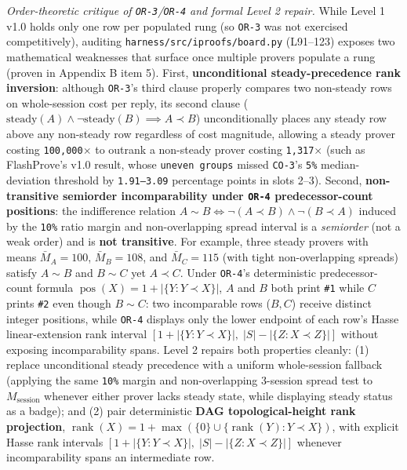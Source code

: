 \documentclass[11pt,letterpaper]{article}
\begin{document}
\textit{Order-theoretic critique of \texttt{OR-3}/\texttt{OR-4} and formal Level 2 repair.} While Level 1 v1.0 holds only one row per populated rung (so \texttt{OR-3} was not exercised competitively), auditing \texttt{harness/\allowbreak{}src/\allowbreak{}iproofs/\allowbreak{}board.\allowbreak{}py} (L91--123) exposes two mathematical weaknesses that surface once multiple provers populate a rung (proven in Appendix B item 5). First, \textbf{unconditional steady-precedence rank inversion}: although \texttt{OR-3}'s third clause properly compares two non-steady rows on whole-session cost per reply, its second clause ($\text{steady}(A) \land \neg\text{steady}(B) \implies A \prec B$) unconditionally places any steady row above any non-steady row regardless of cost magnitude, allowing a steady prover costing \texttt{100,000$\times$} to outrank a non-steady prover costing \texttt{1,317$\times$} (such as FlashProve's v1.0 result, whose \texttt{uneven groups} missed \texttt{CO-3}'s \texttt{5\%} median-deviation threshold by \texttt{1.91--3.09} percentage points in slots 2--3). Second, \textbf{non-transitive semiorder incomparability under \texttt{OR-4} predecessor-count positions}: the indifference relation $A \sim B \iff \neg(A \prec B) \land \neg(B \prec A)$ induced by the \texttt{10\%} ratio margin and non-overlapping spread interval is a \textit{semiorder} (not a weak order) and is \textbf{not transitive}. For example, three steady provers with means $\bar{M}_A = 100$, $\bar{M}_B = 108$, and $\bar{M}_C = 115$ (with tight non-overlapping spreads) satisfy $A \sim B$ and $B \sim C$ yet $A \prec C$. Under \texttt{OR-4}'s deterministic predecessor-count formula $\operatorname{pos}(X) = 1 + |\{Y : Y \prec X\}|$, $A$ and $B$ both print \texttt{\#1} while $C$ prints \texttt{\#2} even though $B \sim C$: two incomparable rows ($B, C$) receive distinct integer positions, while \texttt{OR-4} displays only the lower endpoint of each row's Hasse linear-extension rank interval $[1 + |\{Y : Y \prec X\}|,\; |S| - |\{Z : X \prec Z\}|]$ without exposing incomparability spans. Level 2 repairs both properties cleanly: (1) replace unconditional steady precedence with a uniform whole-session fallback (applying the same \texttt{10\%} margin and non-overlapping 3-session spread test to $M_{\text{session}}$ whenever either prover lacks steady state, while displaying steady status as a badge); and (2) pair deterministic \textbf{DAG topological-height rank projection}, $\operatorname{rank}(X) = 1 + \max(\{0\} \cup \{\operatorname{rank}(Y) : Y \prec X\})$, with explicit Hasse rank intervals $[1 + |\{Y : Y \prec X\}|,\; |S| - |\{Z : X \prec Z\}|]$ whenever incomparability spans an intermediate row.
\end{document}
